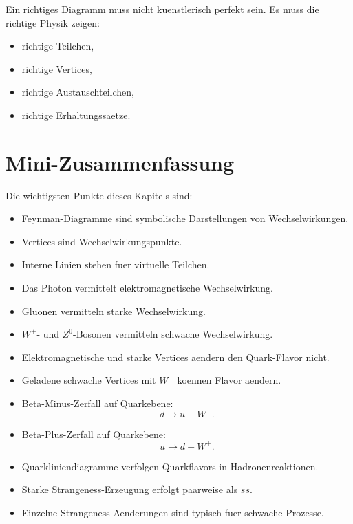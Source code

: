 \begin{conceptbox}
Ein richtiges Diagramm muss nicht kuenstlerisch perfekt sein.
Es muss die richtige Physik zeigen:
\begin{itemize}
    \item richtige Teilchen,
    \item richtige Vertices,
    \item richtige Austauschteilchen,
    \item richtige Erhaltungssaetze.
\end{itemize}
\end{conceptbox}

\section{Mini-Zusammenfassung}

\begin{notebox}
Die wichtigsten Punkte dieses Kapitels sind:
\begin{itemize}
    \item Feynman-Diagramme sind symbolische Darstellungen von Wechselwirkungen.
    \item Vertices sind Wechselwirkungspunkte.
    \item Interne Linien stehen fuer virtuelle Teilchen.
    \item Das Photon vermittelt elektromagnetische Wechselwirkung.
    \item Gluonen vermitteln starke Wechselwirkung.
    \item $W^\pm$- und $Z^0$-Bosonen vermitteln schwache Wechselwirkung.
    \item Elektromagnetische und starke Vertices aendern den Quark-Flavor nicht.
    \item Geladene schwache Vertices mit $W^\pm$ koennen Flavor aendern.
    \item Beta-Minus-Zerfall auf Quarkebene:
    \[
        d \rightarrow u + W^-.
    \]
    \item Beta-Plus-Zerfall auf Quarkebene:
    \[
        u \rightarrow d + W^+.
    \]
    \item Quarkliniendiagramme verfolgen Quarkflavors in Hadronenreaktionen.
    \item Starke Strangeness-Erzeugung erfolgt paarweise als $s\overline{s}$.
    \item Einzelne Strangeness-Aenderungen sind typisch fuer schwache Prozesse.
\end{itemize}
\end{notebox}

